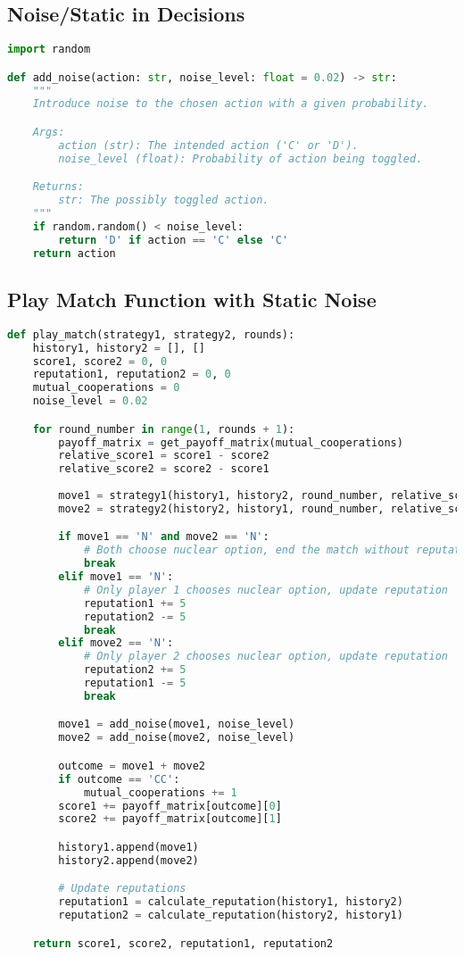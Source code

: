 \documentclass[11pt]{article}
\begin{document}
\subsection*{Noise/Static in Decisions}
\begin{lstlisting}[language=Python]
import random

def add_noise(action: str, noise_level: float = 0.02) -> str:
    """
    Introduce noise to the chosen action with a given probability.

    Args:
        action (str): The intended action ('C' or 'D').
        noise_level (float): Probability of action being toggled.

    Returns:
        str: The possibly toggled action.
    """
    if random.random() < noise_level:
        return 'D' if action == 'C' else 'C'
    return action
\end{lstlisting}

\newpage

\subsection*{Play Match Function with Static Noise}
\begin{lstlisting}[language=Python]
def play_match(strategy1, strategy2, rounds):
    history1, history2 = [], []
    score1, score2 = 0, 0
    reputation1, reputation2 = 0, 0
    mutual_cooperations = 0
    noise_level = 0.02 

    for round_number in range(1, rounds + 1):
        payoff_matrix = get_payoff_matrix(mutual_cooperations)
        relative_score1 = score1 - score2
        relative_score2 = score2 - score1
        
        move1 = strategy1(history1, history2, round_number, relative_score1, reputation2)
        move2 = strategy2(history2, history1, round_number, relative_score2, reputation1)

        if move1 == 'N' and move2 == 'N':
            # Both choose nuclear option, end the match without reputation change
            break
        elif move1 == 'N':
            # Only player 1 chooses nuclear option, update reputation
            reputation1 += 5
            reputation2 -= 5
            break
        elif move2 == 'N':
            # Only player 2 chooses nuclear option, update reputation
            reputation2 += 5
            reputation1 -= 5
            break

        move1 = add_noise(move1, noise_level)
        move2 = add_noise(move2, noise_level)

        outcome = move1 + move2
        if outcome == 'CC':
            mutual_cooperations += 1
        score1 += payoff_matrix[outcome][0]
        score2 += payoff_matrix[outcome][1]

        history1.append(move1)
        history2.append(move2)

        # Update reputations
        reputation1 = calculate_reputation(history1, history2)
        reputation2 = calculate_reputation(history2, history1)

    return score1, score2, reputation1, reputation2
\end{lstlisting}
\end{document}
